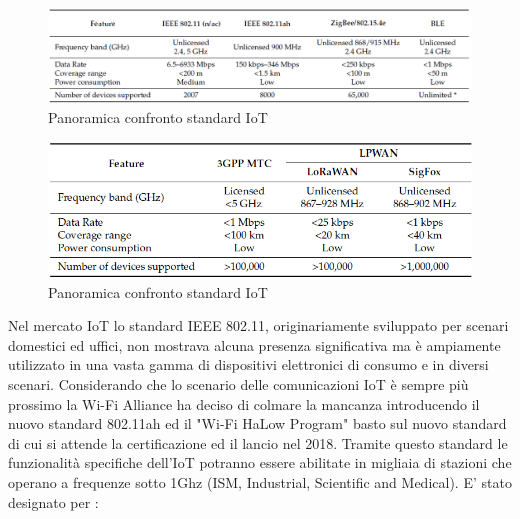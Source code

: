 \begin{figure}
	\centering
	\includegraphics[width=1\linewidth]{imgs/0-confronto}
	\caption[Confronto standard]{Panoramica confronto standard IoT \cite{banos2016ieee}}
	\label{fig:0-confronto}
\end{figure}

\begin{figure}
	\centering
	\includegraphics[width=0.7\linewidth]{imgs/01-confronto}
	\caption[Confronto standard]{Panoramica confronto standard IoT \cite{banos2016ieee}}
	\label{fig:01-confronto}
\end{figure}



Nel mercato IoT lo standard IEEE 802.11, originariamente sviluppato per scenari domestici ed uffici, non mostrava alcuna presenza significativa ma è ampiamente utilizzato in una vasta gamma di dispositivi elettronici di consumo e in diversi scenari. Considerando che lo scenario delle comunicazioni IoT è sempre più prossimo la Wi-Fi Alliance ha deciso di colmare la mancanza introducendo il nuovo standard 802.11ah ed il "Wi-Fi HaLow Program" basto sul nuovo standard di cui si attende la certificazione ed il lancio nel 2018. Tramite questo standard le funzionalità specifiche dell’IoT potranno essere abilitate in migliaia di stazioni che operano a frequenze sotto 1Ghz (ISM, Industrial, Scientific and Medical)\cite{7000982}\cite{7101216}\cite{sun2013ieee}.
E' stato designato per \cite{banos2016ieee}:

